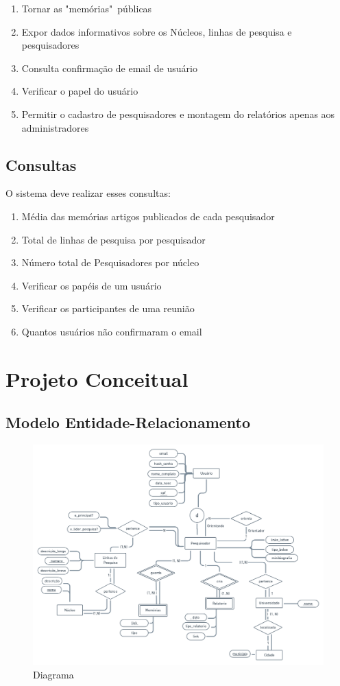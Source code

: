 \documentclass[11pt]{../../classes/ifscarticle}
\begin{document}
\begin{enumerate}
    \item Tornar as "memórias"\ públicas
    \item Expor dados informativos sobre os Núcleos, linhas de pesquisa e pesquisadores
    \item Consulta confirmação de email de usuário
    \item Verificar o papel do usuário
    \item Permitir o cadastro de pesquisadores e montagem do relatórios apenas aos administradores
\end{enumerate}

\subsection{Consultas}


O sistema deve realizar esses consultas:
\begin{enumerate}

    \item Média das memórias artigos publicados de cada pesquisador
    \item Total de linhas de pesquisa por pesquisador
    \item Número total de Pesquisadores por núcleo
    \item Verificar os papéis de um usuário
    \item Verificar os participantes de uma reunião
    \item Quantos usuários não confirmaram o email
\end{enumerate}


\clearpage
\section{Projeto Conceitual}
\subsection{Modelo Entidade-Relacionamento}
\begin{figure}[h]
    \centering
     \includegraphics[width=19cm]{figuras/Diagrama2.png}
    \caption{Diagrama}
    \label{fig:logolatex}
\end{figure}
\clearpage
\end{document}
